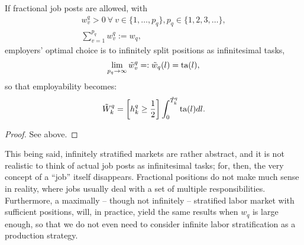 \documentclass[hidelinks, nonatbib]{elsarticle}
\begin{document}
\begin{lemma}
    \label{isl}
    If fractional job posts are allowed, with
    \begin{gather}
        w_{v}^{q} 
        > 0
        \
        \forall
        \
        v \in \{1, \dots, p_q\}
        ,
        p_q \in \{1, 2, 3, \dots\}
        ,
        \\
        \sum_{v=1}^{p_q}
        w_{v}^{q}
        :=
        w_q
        ,
        \end{gather}
        employers' optimal choice is to infinitely split positions as infinitesimal tasks,
        \begin{gather}
            \lim_{p_q \rightarrow \infty}{
                \tilde{w}_{v}^{q}
            }
            =:
            \tilde{w}_{q}(l)
            =
            \text{ta}(l)
            ,
            \end{gather}
            so that employability becomes:
            \begin{gather}
                \tilde{W}_{k}^{q} 
                = 
                \left[
                    h_{k}^{q}
                    \geq
                    \frac{1}{2}
                \right]
                \int_{0}^{\tilde{T}_{k}^{q}}
                \text{ta}(l)
                dl
                .
                \end{gather}
    \begin{proof}
        See above.
    \end{proof}
\end{lemma}

This being said, infinitely stratified markets are rather abstract, and it is not realistic to think of actual job posts as infinitesimal tasks; for, then, the very concept of a ``job'' itself disappears. Fractional positions do not make much sense in reality, where jobs usually deal with a set of multiple responsibilities. Furthermore, a maximally -- though not infinitely -- stratified labor market with sufficient positions, will, in practice, yield the same results when $w_q$ is large enough, so that we do not even need to consider infinite labor stratification as a production strategy.
\end{document}
